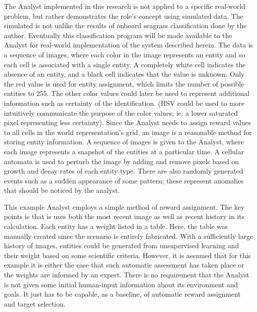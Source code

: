 \documentclass{tamuccthesis}
\begin{document}
The Analyst implemented in this research is not applied to a specific real-world problem, but rather demonstrates the role's concept using simulated data. The simulated is not unlike the results of onboard seagrass classification done by the author. Eventually this classification program will be made available to the Analyst for real-world implementation of the system described herein. The data is a sequence of images, where each color in the image represents an entity and so each cell is associated with a single entity. A completely white cell indicates the absence of an entity, and a black cell indicates that the value is unknown. Only the red value is used for entity assignment, which limits the number of possible entities to 255. The other color values could later be used to represent additional information such as certainty of the identification. (HSV could be used to more intuitively communicate the purpose of the color values; ie: a lower saturated pixel representing less certainty). Since the Analyst needs to assign reward values to all cells in the world representation's grid, an image is a reasonable method for storing entity information. A sequence of images is given to the Analyst, where each image represents a snapshot of the entities at a particular time. A cellular automata is used to perturb the image by adding and remove pixels based on growth and decay rates of each entity type. There are also randomly generated events such as a sudden appearance of some pattern; these represent anomalies that should be noticed by the analyst. 

This example Analyst employs a simple method of reward assignment. The key points is that is uses both the most recent image as well as recent history in its calculation. Each entity has a weight listed in a table. Here, the table was manually created since the scenario is entirely fabricated. With a sufficiently large history of images, entities could be generated from unsupervised learning and their weight based on some scientific criteria. However, it is assumed that for this example it is either the case that such automatic assessment has taken place or the weights are informed by an expert. There is no requirement that the Analyst is not given some initial human-input information about its environment and goals. It just has to be capable, as a baseline, of automatic reward assignment and target selection. 
\end{document}
